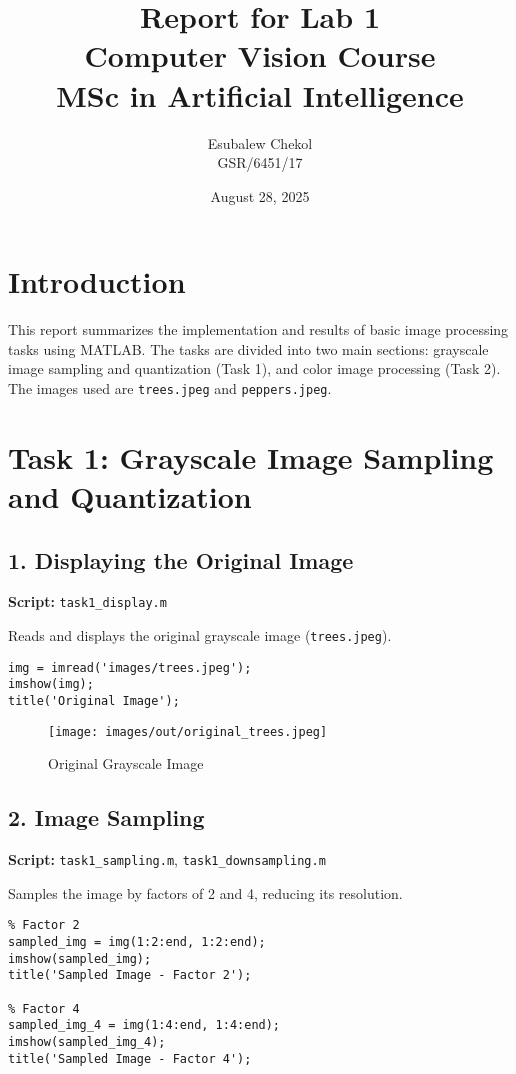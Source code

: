 \documentclass[12pt,a4paper]{article}
\title{Report for Lab 1\\
Computer Vision Course\\
MSc in Artificial Intelligence}
\author{Esubalew Chekol\\
GSR/6451/17}
\date{August 28, 2025}
\begin{document}
\maketitle

\section*{Introduction}
This report summarizes the implementation and results of basic image processing tasks using MATLAB. The tasks are divided into two main sections: grayscale image sampling and quantization (Task 1), and color image processing (Task 2). The images used are \texttt{trees.jpeg} and \texttt{peppers.jpeg}.

\section*{Task 1: Grayscale Image Sampling and Quantization}

\subsection*{1. Displaying the Original Image}
\textbf{Script:} \texttt{task1\_display.m}

Reads and displays the original grayscale image (\texttt{trees.jpeg}).

\begin{verbatim}
img = imread('images/trees.jpeg');
imshow(img);
title('Original Image');
\end{verbatim}

\begin{figure}[H]
    \centering
    \texttt{[image: images/out/original\_trees.jpeg]}
    \caption{Original Grayscale Image}
\end{figure}

\subsection*{2. Image Sampling}
\textbf{Script:} \texttt{task1\_sampling.m}, \texttt{task1\_downsampling.m}

Samples the image by factors of 2 and 4, reducing its resolution.

\begin{verbatim}
% Factor 2
sampled_img = img(1:2:end, 1:2:end);
imshow(sampled_img);
title('Sampled Image - Factor 2');

% Factor 4
sampled_img_4 = img(1:4:end, 1:4:end);
imshow(sampled_img_4);
title('Sampled Image - Factor 4');
\end{verbatim}
\end{document}

